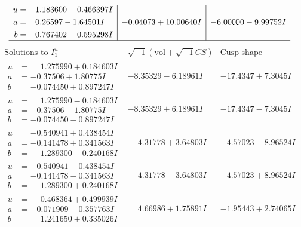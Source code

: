 \documentclass[1p]{elsarticle_modified}
\theoremstyle{definition}
\newcommand{\I}{\sqrt{-1}}
\begin{document}
$$\begin{array}{c|c|c}
\begin{aligned}
u &= \phantom{-}1.183600 - 0.466397 I \\
a &= \phantom{-}0.26597 - 1.64501 I \\
b &= -0.767402 - 0.595298 I\end{aligned}
 & -0.04073 + 10.00640 I & -6.00000 - 9.99752 I\\
 \hline 
 \end{array}$$\newpage$$\begin{array}{c|c|c}  
\text{Solutions to }I^u_{1}& \I (\text{vol} + \sqrt{-1}CS) & \text{Cusp shape}\\
 \hline 
\begin{aligned}
u &= \phantom{-}1.275990 + 0.184603 I \\
a &= -0.37506 + 1.80775 I \\
b &= -0.074450 + 0.897247 I\end{aligned}
 & -8.35329 - 6.18961 I & -17.4347 + 7.3045 I \\ \hline\begin{aligned}
u &= \phantom{-}1.275990 - 0.184603 I \\
a &= -0.37506 - 1.80775 I \\
b &= -0.074450 - 0.897247 I\end{aligned}
 & -8.35329 + 6.18961 I & -17.4347 - 7.3045 I \\ \hline\begin{aligned}
u &= -0.540941 + 0.438454 I \\
a &= -0.141478 + 0.341563 I \\
b &= \phantom{-}1.289300 - 0.240168 I\end{aligned}
 & \phantom{-}4.31778 + 3.64803 I & -4.57023 - 8.96524 I \\ \hline\begin{aligned}
u &= -0.540941 - 0.438454 I \\
a &= -0.141478 - 0.341563 I \\
b &= \phantom{-}1.289300 + 0.240168 I\end{aligned}
 & \phantom{-}4.31778 - 3.64803 I & -4.57023 + 8.96524 I \\ \hline\begin{aligned}
u &= \phantom{-}0.468364 + 0.499939 I \\
a &= -0.071909 - 0.357763 I \\
b &= \phantom{-}1.241650 + 0.335026 I\end{aligned}
 & \phantom{-}4.66986 + 1.75891 I & -1.95443 + 2.74065 I \\ \hline\begin{aligned}

\end{aligned}
\end{array}$$
\end{document}
